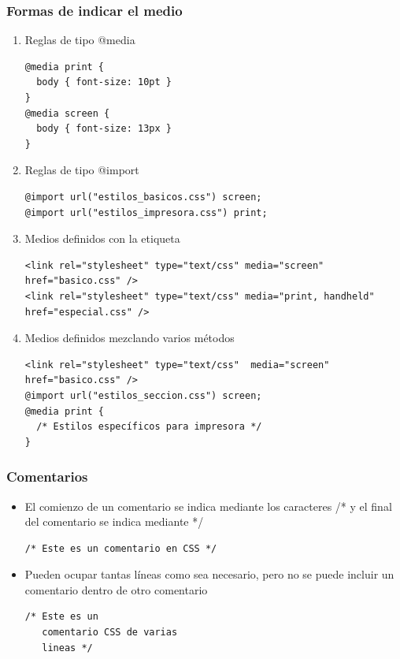 \documentclass[ucs]{beamer}
\begin{document}

\begin{frame}[fragile]
\frametitle{Formas de indicar el medio}

\begin{enumerate}
  \item Reglas de tipo @media
{\footnotesize
    \begin{verbatim}
@media print {
  body { font-size: 10pt }
}
@media screen {
  body { font-size: 13px }
}
    \end{verbatim}
}
  \item Reglas de tipo @import
{\footnotesize
    \begin{verbatim}
@import url("estilos_basicos.css") screen;
@import url("estilos_impresora.css") print;
    \end{verbatim}
}
  \item Medios definidos con la etiqueta
{\footnotesize
    \begin{verbatim}
<link rel="stylesheet" type="text/css" media="screen" href="basico.css" />
<link rel="stylesheet" type="text/css" media="print, handheld" href="especial.css" />
    \end{verbatim}
}
  \item Medios definidos mezclando varios métodos
{\footnotesize
    \begin{verbatim}
<link rel="stylesheet" type="text/css"  media="screen" href="basico.css" />
@import url("estilos_seccion.css") screen;
@media print {
  /* Estilos específicos para impresora */
}
    \end{verbatim}
}
\end{enumerate}

\end{frame}


\begin{frame}[fragile]
\frametitle{Comentarios}

\begin{itemize}
  \item El comienzo de un comentario se indica mediante los caracteres /* y el final del comentario se indica mediante */
    \begin{verbatim}
/* Este es un comentario en CSS */
    \end{verbatim}
  \item Pueden ocupar tantas líneas como sea necesario, pero no se puede incluir un comentario dentro de otro comentario
    \begin{verbatim}
/* Este es un
   comentario CSS de varias
   lineas */
    \end{verbatim}
\end{itemize}

\end{frame}
\end{document}
